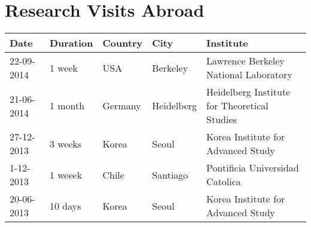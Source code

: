 \documentclass{report}
\begin{document}
\section*{Research Visits Abroad}

\begin{tabular}{p{2.0cm} p{1.5cm} p{1.5cm} p{1.5cm} p{5.5cm}}\hline
Date & Duration & Country & City & Institute\\\hline
22-09-2014 & 1 week & USA & Berkeley & Lawrence Berkeley National Laboratory\\
21-06-2014 & 1 month & Germany & Heidelberg & Heidelberg Institute for Theoretical Studies \\
27-12-2013 & 3 weeks & Korea & Seoul & Korea Institute for Advanced Study\\
1-12-2013 & 1 weeek & Chile & Santiago & Pontificia Universidad Catolica\\
20-06-2013 & 10 days & Korea & Seoul & Korea Institute for Advanced Study\\\hline
\end{tabular}
\end{document}
